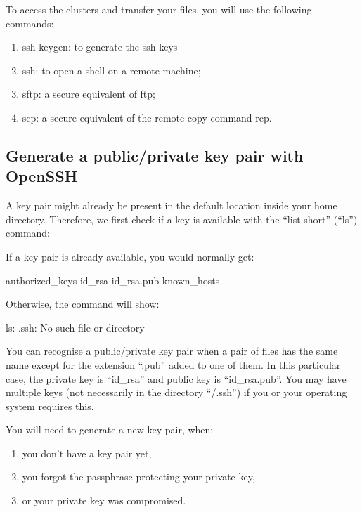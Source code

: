   To access the clusters and transfer your files, you will use the following commands:

  \begin{enumerate}
    \item  ssh-keygen: to generate the ssh keys
    \item  ssh: to open a shell on a remote machine;
    \item  sftp: a secure equivalent of ftp;
    \item  scp: a secure equivalent of the remote copy command rcp.
  \end{enumerate}

  \subsection{Generate a public/private key pair with OpenSSH}
  \label{sec:generate-key-pair-with-openssh}

  A key pair might already be present in the default location inside your home
  directory. Therefore, we first check if a key is available with the ``list
  short'' (``ls'')  command:

\begin{prompt}
\end{prompt}


  If a key-pair is already available, you would normally get:
\begin{prompt}
authorized_keys    id_rsa            id_rsa.pub         known_hosts
\end{prompt}

  Otherwise, the command will show:

\begin{prompt}
ls: .ssh: No such file or directory
\end{prompt}

  You can recognise a public/private key pair when a pair of files has the same
  name except for the extension ``.pub'' added to one of them. In this particular
  case, the private key is ``id\_rsa'' and public key is ``id\_rsa.pub''. You may
  have multiple keys (not necessarily in the directory ``\tilde/.ssh'') if you or
  your operating system requires this.

  You will need to generate a new key pair, when:
  \begin{enumerate}
    \item  you don't have a key pair yet,
    \item  you forgot the passphrase protecting your private key,
    \item  or your private key was compromised.
  \end{enumerate}

